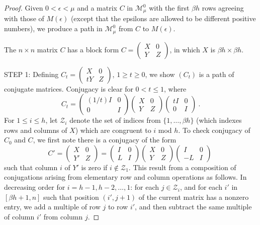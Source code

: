 \documentclass{amsart}
\theoremstyle{definition}
\theoremstyle{remark}
\numberwithin{equation}{section}
\begin{document}
{{\begin{proof}
Given $0<\epsilon < \mu$ and 
a matrix $C$  in $\mathcal M^0_{\mu}$ 
with the first $\beta h$ rows agreeing with those of 
$M(\epsilon)$ (except that the epsilons are allowed to 
be different positive numbers), we produce a path in 
$\mathcal M^0_{\mu}$ from $C$ to $M(\epsilon)$. 

The $n\times n$ matrix $C$ has a block form 
$C= 
\left(\begin{smallmatrix} X & 0 \\ Y & Z 
\end{smallmatrix} \right)$, in which $X$ is $\beta h\times \beta h$. 

STEP 1: Defining 
$C_t= 
\left(\begin{smallmatrix} X & 0 \\ tY & Z 
\end{smallmatrix} \right)$, $1\geq t\geq 0$, we 
show $(C_t)$ is a path of conjugate matrices. 
Conjugacy is clear for $0<t\leq 1$, where 
\[
C_t= 
\begin{pmatrix} 
(1/t)I & 0 \\ 0 & I 
\end{pmatrix} 
\begin{pmatrix} 
X & 0 \\ Y & Z 
\end{pmatrix} 
\begin{pmatrix} 
tI & 0 \\ 0 & I 
\end{pmatrix} \ . 
\] 
For $1\leq i \leq h$, let 
$\mathcal Z_i$ denote the set of indices from 
$\{1,\dots ,\beta h\}$ (which indexes rows and 
columns of $X$) which are congruent to $i$ 
mod $h$. 
To check conjugacy of $C_0$ and $C$, 
we first note there is a conjugacy of the form 
\[
C'= 
\begin{pmatrix} 
X & 0 \\ Y' & Z 
\end{pmatrix} 
=
\begin{pmatrix} 
I & 0 \\ L & I 
\end{pmatrix} 
\begin{pmatrix} 
X & 0 \\ Y & Z 
\end{pmatrix} 
\begin{pmatrix} 
I & 0 \\ -L & I 
\end{pmatrix} \  
\] 
such that column $i$ of $Y'$ is zero if $i\notin \mathcal Z_1$. 
This result from a composition of conjugations 
arising from  elementary
row and column operations as follows. In decreasing order for
$i=h-1,h-2,\dots , 1$:  for each $j\in \mathcal Z_i$, 
and for each $i'$ in 
$[\beta h +1,  n]$ such that position 
$(i',j+1)$ of the current matrix 
has  a nonzero entry, 
 we add a multiple of row $j$ to row $i'$, and 
then subtract the same multiple of 
column $i'$ from column $j$. 


\end{proof}}}
\end{document}
